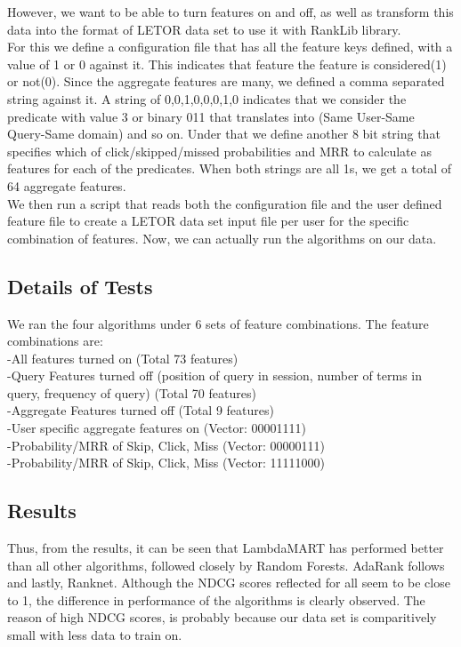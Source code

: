 \documentclass[11pt,letterpaper]{article}
\begin{document}
However, we want to be able to turn features on and off, as well as transform this data into the format of LETOR data set to use it with RankLib library.\\
For this we define a configuration file that has all the feature keys defined, with a value of 1 or 0 against it. This indicates that feature the feature is considered(1) or not(0). Since the aggregate features are many, we defined a comma separated string against it. A string of 0,0,1,0,0,0,1,0 indicates that we consider the predicate with value 3 or binary 011 that translates into (Same User-Same Query-Same domain) and so on. Under that we define another 8 bit string that specifies which of click/skipped/missed probabilities and MRR to calculate as features for each of the predicates. When both strings are all 1s, we get a total of 64 aggregate features. \\ 
We then run a script that reads both the configuration file and the user defined feature file to create a LETOR data set input file per user for the specific combination of features. Now, we can actually run the algorithms on our data.
\subsection{Details of Tests}
We ran the four algorithms under 6 sets of feature combinations. The feature combinations are:\\
-All features turned on (Total 73 features)\\
-Query Features turned off (position of query in session, number of terms in query, frequency of query) (Total 70 features) \\
-Aggregate Features turned off (Total 9 features)\\
-User specific aggregate features on (Vector: 00001111)\\
-Probability/MRR of Skip, Click, Miss (Vector: 00000111)\\ 
-Probability/MRR of Skip, Click, Miss (Vector: 11111000)\\ 
\subsection{Results}
Thus, from the results, it can be seen that LambdaMART has performed better than all other algorithms, followed closely by Random Forests. AdaRank follows and lastly, Ranknet. Although the NDCG scores reflected for all seem to be close to 1, the difference in performance of the algorithms is clearly observed. The reason of high NDCG scores, is probably because our data set is comparitively small with less data to train on.\\
\end{document}
